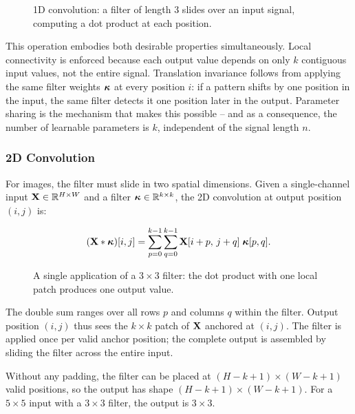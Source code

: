 \begin{figure}
    \centering
    \resizebox{0.43\textwidth}{!}{}
    \caption{1D convolution: a filter of length 3 slides over an input signal, computing a dot product at each position.}
    \label{fig:conv1d}
\end{figure}

This operation embodies both desirable properties simultaneously. Local connectivity is enforced because each output value depends on only $k$ contiguous input values, not the entire signal. Translation invariance follows from applying the same filter weights $\boldsymbol{\kappa}$ at every position $i$: if a pattern shifts by one position in the input, the same filter detects it one position later in the output. Parameter sharing is the mechanism that makes this possible -- and as a consequence, the number of learnable parameters is $k$, independent of the signal length $n$.

\subsubsection{2D Convolution}

For images, the filter must slide in two spatial dimensions. Given a single-channel input $\mathbf{X} \in \mathbb{R}^{H \times W}$ and a filter $\boldsymbol{\kappa} \in \mathbb{R}^{k \times k}$, the 2D convolution at output position $(i, j)$ is:

\begin{equation}
    (\mathbf{X} * \boldsymbol{\kappa})[i,j] = \sum_{p=0}^{k-1}\sum_{q=0}^{k-1} \mathbf{X}[i+p,\, j+q]\; \boldsymbol{\kappa}[p,q].
    \label{eq:conv2d}
\end{equation}

\begin{figure}
    \centering
    \resizebox{0.43\textwidth}{!}{}
    \caption{A single application of a $3\times3$ filter: the dot product with one local patch produces one output value.}
    \label{fig:conv2d}
\end{figure}

The double sum ranges over all rows $p$ and columns $q$ within the filter. Output position $(i, j)$ thus sees the $k \times k$ patch of $\mathbf{X}$ anchored at $(i, j)$. The filter is applied once per valid anchor position; the complete output is assembled by sliding the filter across the entire input.

Without any padding, the filter can be placed at $(H - k + 1) \times (W - k + 1)$ valid positions, so the output has shape $(H - k + 1) \times (W - k + 1)$. For a $5 \times 5$ input with a $3 \times 3$ filter, the output is $3 \times 3$.

